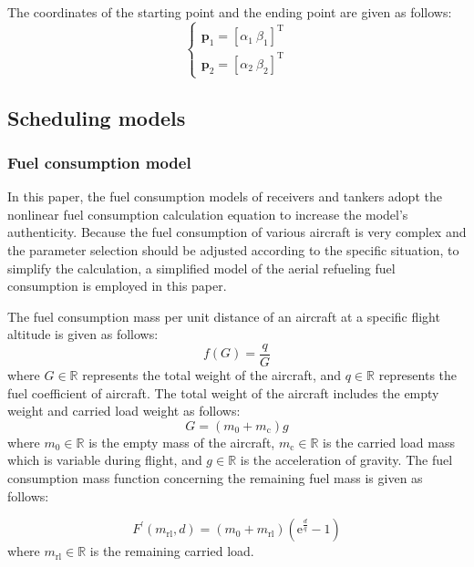 The coordinates of the starting point and the ending point are given as follows:
\begin{equation}
\begin{cases}\mathbf{p}_{1}=\left[\alpha_1\ \beta_1\right]^{\text{T}}\\\mathbf{p}_2=\left[\alpha_2\ \beta_2\right]^{\text{T}}\end{cases}
\label{eq:15.2}
\end{equation}	

\subsection{Scheduling models}
\subsubsection{Fuel consumption model}\label{sec_2.3.1}

In this paper, the fuel consumption models of receivers and tankers adopt the nonlinear fuel consumption calculation equation to increase the model's authenticity. Because the fuel consumption of various aircraft is very complex and the parameter selection should be adjusted according to the specific situation, to simplify the calculation, a simplified model of the aerial refueling fuel consumption is employed in this paper.

The fuel consumption mass per unit distance of an aircraft at a specific flight altitude is given as follows:
\begin{equation}
f(G)=\frac{q}{G}
\label{eq:15.3}
\end{equation}	  
where $G\in\mathbb{R}$ represents the total weight of the aircraft, and $q\in\mathbb{R}$ represents the fuel coefficient of aircraft. The total weight of the aircraft includes the empty weight and carried load weight as follows:    
\begin{equation}
G=\left(m_\text{0}+m_\text{c}\right)g
\label{eq:15.4}
\end{equation}	  
where $m_\text{0}\in\mathbb{R}$ is the empty mass of the aircraft, $m_\text{c}\in\mathbb{R}$ is the carried load mass which is variable during flight, and $g\in\mathbb{R}$ is the acceleration of gravity. The fuel consumption mass function concerning the remaining fuel mass is given as follows:\cite{marchman2004aerodynamics}

\begin{equation}
F^{\prime}\left(m_{\text{rl}},d\right)=\left(m_\text{0}+m_{\text{rl}}\right)\left(\text{e}^{\frac dq}-1\right)
\label{eq:15.5}
\end{equation}	 
where $m_\text{rl}\in\mathbb{R}$ is the remaining carried load.

